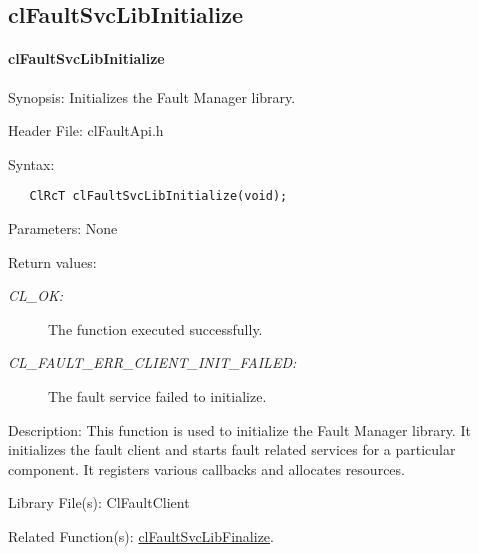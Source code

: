 \begin{flushleft}
\subsection{clFaultSvcLibInitialize}
\hypertarget{pagefm103}{}\paragraph{cl\-Fault\-Svc\-Lib\-Initialize}\label{pagefm103}
\begin{Desc}
\item[Synopsis:]Initializes the Fault Manager library.\end{Desc}
\begin{Desc}
\item[Header File:]clFaultApi.h\end{Desc}
\begin{Desc}
\item[Syntax:]

\footnotesize\begin{verbatim}   ClRcT clFaultSvcLibInitialize(void);
\end{verbatim}
\normalsize
\end{Desc}
\begin{Desc}
\item[Parameters:]None\end{Desc}
\begin{Desc}
\item[Return values:]
\begin{description}
\item[{\em CL\_\-OK:}]The function executed successfully. 
\item[{\em CL\_\-FAULT\_\-ERR\_\-CLIENT\_\-INIT\_\-FAILED:}]The fault service failed to initialize.\end{description}
\end{Desc}
\begin{Desc}
\item[Description:]This function is used to initialize the Fault Manager library. It initializes the fault client and starts fault related services for
a particular component. It registers various callbacks and allocates resources.\end{Desc}
\begin{Desc}
\item[Library File(s):]Cl\-Fault\-Client\end{Desc}
\begin{Desc}
\item[Related Function(s):]\hyperlink{pagefm104}{cl\-Fault\-Svc\-Lib\-Finalize}. \end{Desc}
\newpage



\end{flushleft}
